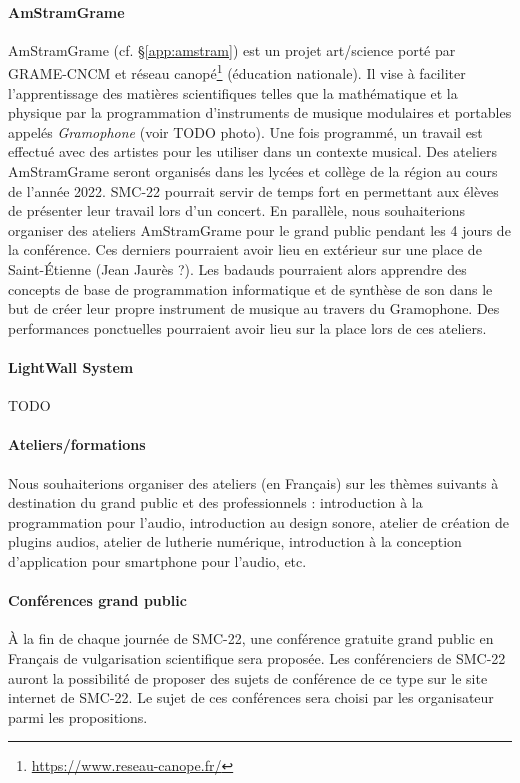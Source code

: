 \documentclass[fontsize=12pt]{scrartcl} %
\numberwithin{equation}{section} %
\numberwithin{figure}{section} %
\numberwithin{table}{section} %
\begin{document}
\paragraph{\textbf{AmStramGrame}} AmStramGrame (cf. \S\ref{app:amstram}) est un projet art/science porté par GRAME-CNCM et réseau canopé\footnote{\url{https://www.reseau-canope.fr/}} (éducation nationale). Il vise à faciliter l'apprentissage des matières scientifiques telles que la mathématique et la physique par la programmation d'instruments de musique modulaires et portables appelés \textit{Gramophone} (voir TODO photo). Une fois programmé, un travail est effectué avec des artistes pour les utiliser dans un contexte musical. Des ateliers AmStramGrame seront organisés dans les lycées et collège de la région au cours de l'année 2022. SMC-22 pourrait servir de temps fort en permettant aux élèves de présenter leur travail lors d'un concert. En parallèle, nous souhaiterions organiser des ateliers AmStramGrame pour le grand public pendant les 4 jours de la conférence. Ces derniers pourraient avoir lieu en extérieur sur une place de Saint-Étienne (Jean Jaurès ?). Les badauds pourraient alors apprendre des concepts de base de programmation informatique et de synthèse de son dans le but de créer leur propre instrument de musique au travers du Gramophone. Des performances ponctuelles pourraient avoir lieu sur la place lors de ces ateliers.  

\paragraph{\textbf{LightWall System}} TODO

\paragraph{\textbf{Ateliers/formations}} Nous souhaiterions organiser des ateliers (en Français) sur les thèmes suivants à destination du grand public et des professionnels : introduction à la programmation pour l'audio, introduction au design sonore, atelier de création de plugins audios, atelier de lutherie numérique, introduction à la conception d'application pour smartphone pour l'audio, etc.

\paragraph{\textbf{Conférences grand public}} À la fin de chaque journée de SMC-22, une conférence gratuite grand public en Français de vulgarisation scientifique sera proposée. Les conférenciers de SMC-22 auront la possibilité de proposer des sujets de conférence de ce type sur le site internet de SMC-22. Le sujet de ces conférences sera choisi par les organisateur parmi les propositions.
\end{document}
